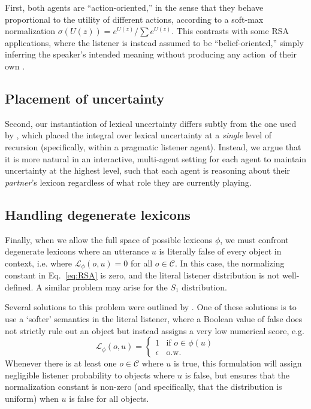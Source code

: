 \documentclass[10pt, man, floatsintext]{apa7}
\begin{document}
First, both agents are ``action-oriented,'' in the sense that they behave proportional to the utility of different actions, according to a soft-max normalization $\sigma(U(z)) = e^{U(z)}/\sum e^{U(z)}$.
This contrasts with some RSA applications, where the listener is instead assumed to be ``belief-oriented,'' simply inferring the speaker's intended meaning without producing any action of their own \cite{qing2015variations}.

\subsection{Placement of uncertainty}

Second, our instantiation of lexical uncertainty differs subtly from the one used by , which placed the integral over lexical uncertainty at a \emph{single} level of recursion (specifically, within a pragmatic listener agent).
Instead, we argue that it is more natural in an interactive, multi-agent setting for each agent to maintain uncertainty at the highest level, such that each agent is reasoning about their \emph{partner}'s lexicon regardless of what role they are currently playing.


\subsection{Handling degenerate lexicons}

Finally, when we allow the full space of possible lexicons $\phi$, we must confront degenerate lexicons where an utterance $u$ is literally false of every object in context, i.e. where $\mathcal{L}_\phi(o, u) = 0$ for all $o\in \mathcal{C}$. 
In this case, the normalizing constant in Eq.~\ref{eq:RSA} is zero, and the literal listener distribution is not well-defined.
A similar problem may arise for the $S_1$ distribution.

Several solutions to this problem were outlined by .
One of these solutions is to use a `softer' semantics in the literal listener, where a Boolean value of false does not strictly rule out an object but instead assigns a very low numerical score, e.g. 
$$\mathcal{L}_\phi(o,u) = \left\{ \begin{array} {rl} 1 & \textrm{if }o \in \phi(u) \\ \epsilon & \textrm{o.w.} \end{array}\right.$$
Whenever there is at least one $o\in\mathcal{C}$ where $u$ is true, this formulation will assign negligible listener probability to objects where $u$ is false, but ensures that the normalization constant is non-zero (and specifically, that the distribution is uniform) when $u$ is false for all objects.
\end{document}
